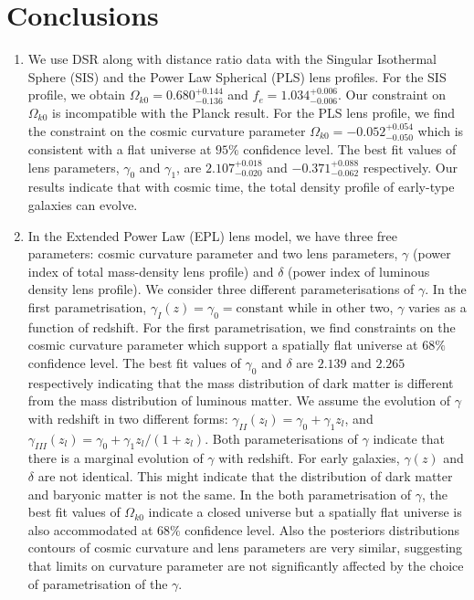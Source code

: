 \documentclass[12pt]{report}
\begin{document}
\section{Conclusions}
\begin{enumerate}
\item
We use DSR along with distance ratio data with the Singular Isothermal Sphere (SIS) and the  Power Law Spherical (PLS) lens profiles. For  the SIS profile, we obtain $\Omega_{k 0}=0.680_{-0.136}^{+0.144}$ and $f_e=1.034_{-0.006}^{+0.006}$. Our constraint on $\Omega_{k0}$ is incompatible with the Planck result. For the PLS lens profile, we find the constraint on the cosmic curvature parameter $\Omega_{k0}=-0.052^{+0.054}_{-0.050}$ which is consistent with a flat universe at $95\%$ confidence level. The best fit values of lens parameters, $\gamma_{0}$ and $\gamma_{1}$, are $2.107_{-0.020}^{+0.018}$ and $-0.371_{-0.062}^{+0.088}$ respectively. Our results indicate that with cosmic time, the total density profile of early-type galaxies can evolve.
\item
In the Extended Power Law (EPL) lens model, we have three free parameters: cosmic curvature parameter and two lens parameters, $\gamma$ (power index of total mass-density lens profile) and $\delta$ (power index of luminous density lens profile). We consider three different parameterisations of $\gamma$. In the first parametrisation, $\gamma_I(z)=\gamma_0=\text{constant}$ while in other two, $\gamma$  varies as a function of redshift. For the first parametrisation, we find constraints on the cosmic curvature parameter which support a spatially flat universe at $68\%$ confidence level. The best fit values of $\gamma_0$ and $\delta$ are $2.139$ and $2.265$ respectively indicating that the mass distribution of dark matter is different from the mass distribution of luminous matter. We assume the evolution of $\gamma$ with redshift in two different forms: $\gamma_{II}(z_l)=\gamma_0+\gamma_1z_l$, and $\gamma_{III}(z_l)=\gamma_0+\gamma_1z_l/(1+z_l)$. Both parameterisations of $\gamma$ indicate that there is a marginal evolution of $\gamma$ with redshift. For early galaxies, $\gamma(z)$ and $\delta$ are not identical. This might indicate that the distribution of dark matter and baryonic matter is not the same. In the both parametrisation of $\gamma$, the best fit values of $\Omega_{k0}$ indicate a closed universe but a spatially flat universe is also accommodated at $68\%$ confidence level. Also the posteriors distributions contours of cosmic curvature and lens parameters are very similar, suggesting that limits on curvature parameter are not significantly affected by the choice of parametrisation of the $\gamma$.

\end{enumerate}
\end{document}
